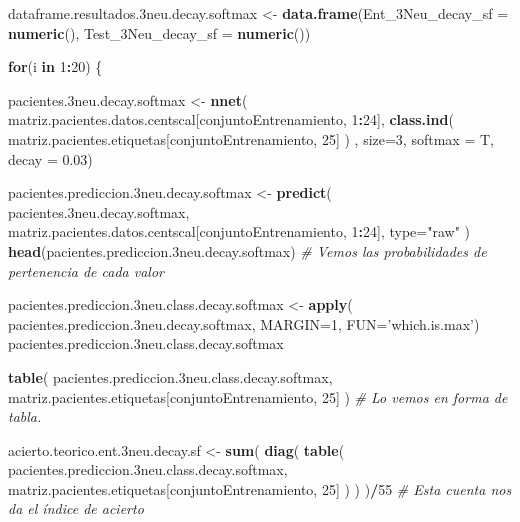 \documentclass[]{article}
\newenvironment{Shaded}{\begin{snugshade}}{\end{snugshade}}
\newcommand{\KeywordTok}[1]{\textcolor[rgb]{0.13,0.29,0.53}{\textbf{#1}}}
\newcommand{\DataTypeTok}[1]{\textcolor[rgb]{0.13,0.29,0.53}{#1}}
\newcommand{\DecValTok}[1]{\textcolor[rgb]{0.00,0.00,0.81}{#1}}
\newcommand{\FloatTok}[1]{\textcolor[rgb]{0.00,0.00,0.81}{#1}}
\newcommand{\StringTok}[1]{\textcolor[rgb]{0.31,0.60,0.02}{#1}}
\newcommand{\CommentTok}[1]{\textcolor[rgb]{0.56,0.35,0.01}{\textit{#1}}}
\newcommand{\ControlFlowTok}[1]{\textcolor[rgb]{0.13,0.29,0.53}{\textbf{#1}}}
\newcommand{\OperatorTok}[1]{\textcolor[rgb]{0.81,0.36,0.00}{\textbf{#1}}}
\newcommand{\NormalTok}[1]{#1}
\begin{document}
\begin{Shaded}
\begin{Highlighting}[]
\NormalTok{dataframe.resultados.3neu.decay.softmax <-}\StringTok{ }\KeywordTok{data.frame}\NormalTok{(}\DataTypeTok{Ent_3Neu_decay_sf =} \KeywordTok{numeric}\NormalTok{(),}
                                                      \DataTypeTok{Test_3Neu_decay_sf =} \KeywordTok{numeric}\NormalTok{())}

\ControlFlowTok{for}\NormalTok{(i }\ControlFlowTok{in} \DecValTok{1}\OperatorTok{:}\DecValTok{20}\NormalTok{)}
\NormalTok{\{}

\NormalTok{  pacientes.3neu.decay.softmax <-}\StringTok{ }\KeywordTok{nnet}\NormalTok{( matriz.pacientes.datos.centscal[conjuntoEntrenamiento, }\DecValTok{1}\OperatorTok{:}\DecValTok{24}\NormalTok{], }\KeywordTok{class.ind}\NormalTok{( matriz.pacientes.etiquetas[conjuntoEntrenamiento, }\DecValTok{25}\NormalTok{] ) , }\DataTypeTok{size=}\DecValTok{3}\NormalTok{, }\DataTypeTok{softmax =}\NormalTok{ T, }\DataTypeTok{decay =} \FloatTok{0.03}\NormalTok{)}
  
\NormalTok{  pacientes.prediccion.3neu.decay.softmax <-}\StringTok{ }\KeywordTok{predict}\NormalTok{( pacientes.3neu.decay.softmax, matriz.pacientes.datos.centscal[conjuntoEntrenamiento, }\DecValTok{1}\OperatorTok{:}\DecValTok{24}\NormalTok{], }\DataTypeTok{type=}\StringTok{"raw"}\NormalTok{ )}
  \KeywordTok{head}\NormalTok{(pacientes.prediccion.3neu.decay.softmax) }\CommentTok{# Vemos las probabilidades de pertenencia de cada valor}
  
  
\NormalTok{  pacientes.prediccion.3neu.class.decay.softmax <-}\StringTok{ }\KeywordTok{apply}\NormalTok{( pacientes.prediccion.3neu.decay.softmax, }\DataTypeTok{MARGIN=}\DecValTok{1}\NormalTok{, }\DataTypeTok{FUN=}\StringTok{'which.is.max'}\NormalTok{)}
\NormalTok{  pacientes.prediccion.3neu.class.decay.softmax}
  
  
  \KeywordTok{table}\NormalTok{( pacientes.prediccion.3neu.class.decay.softmax, matriz.pacientes.etiquetas[conjuntoEntrenamiento, }\DecValTok{25}\NormalTok{] )  }\CommentTok{# Lo vemos en forma de tabla.}
  
  
\NormalTok{  acierto.teorico.ent.3neu.decay.sf <-}\StringTok{ }\KeywordTok{sum}\NormalTok{( }\KeywordTok{diag}\NormalTok{( }\KeywordTok{table}\NormalTok{( pacientes.prediccion.3neu.class.decay.softmax, matriz.pacientes.etiquetas[conjuntoEntrenamiento, }\DecValTok{25}\NormalTok{] ) ) )}\OperatorTok{/}\DecValTok{55} \CommentTok{# Esta cuenta nos da el índice de acierto}
  

\end{Highlighting}
\end{Shaded}
\end{document}
